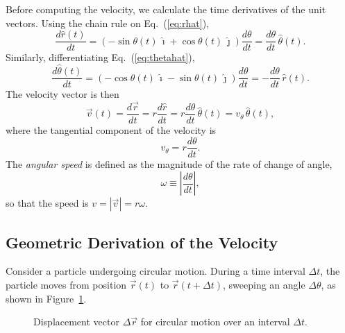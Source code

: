 Before computing the velocity, we calculate the time derivatives of the unit vectors. Using the chain rule on Eq.~(\ref{eq:rhat}),
\begin{equation}
    \frac{d\hat{r}(t)}{dt} = \left(-\sin\theta(t)\,\hat{\imath} + \cos\theta(t)\,\hat{\jmath}\right)\frac{d\theta}{dt} = \frac{d\theta}{dt}\,\hat{\theta}(t).
\end{equation}
Similarly, differentiating Eq.~(\ref{eq:thetahat}),
\begin{equation}
    \frac{d\hat{\theta}(t)}{dt} = \left(-\cos\theta(t)\,\hat{\imath} - \sin\theta(t)\,\hat{\jmath}\right)\frac{d\theta}{dt} = -\frac{d\theta}{dt}\,\hat{r}(t).
\end{equation}
The velocity vector is then
\begin{equation}
    \vec{v}(t) = \frac{d\vec{r}}{dt} = r\frac{d\hat{r}}{dt} = r\frac{d\theta}{dt}\,\hat{\theta}(t) = v_\theta\,\hat{\theta}(t),
\end{equation}
where the tangential component of the velocity is
\begin{equation}
    v_\theta = r\frac{d\theta}{dt}.
\end{equation}
The \textit{angular speed} is defined as the magnitude of the rate of change of angle,
\begin{equation}
    \omega \equiv \left|\frac{d\theta}{dt}\right|,
\end{equation}
so that the speed is $v = |\vec{v}| = r\omega$.

\subsection{Geometric Derivation of the Velocity}

Consider a particle undergoing circular motion. During a time interval $\Delta t$, the particle moves from position $\vec{r}(t)$ to $\vec{r}(t+\Delta t)$, sweeping an angle $\Delta\theta$, as shown in Figure~\ref{fig:displacement}.

\begin{figure}[ht]
\centering
{}
\caption{Displacement vector $\Delta\vec{r}$ for circular motion over an interval $\Delta t$.}
\label{fig:displacement}
\end{figure}

